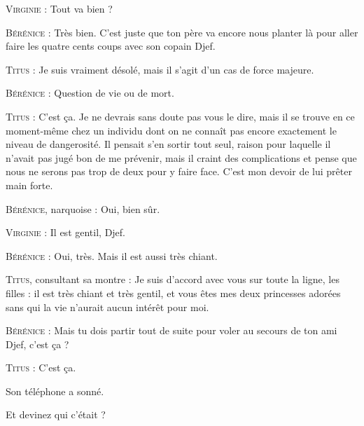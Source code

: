 \begin{dialogue}

\textsc{Virginie} : Tout va bien ?

\textsc{Bérénice} : Très bien. C’est juste que ton père va encore nous planter là pour aller faire les quatre cents coups avec son copain Djef.

\textsc{Titus} : Je suis vraiment désolé, mais il s’agit d’un cas de force majeure.

\textsc{Bérénice} : Question de vie ou de mort.

\textsc{Titus} : C’est ça. Je ne devrais sans doute pas vous le dire, mais il se trouve en ce moment-même chez un individu dont on ne connaît pas encore exactement le niveau de dangerosité. Il pensait s’en sortir tout seul, raison pour laquelle il n’avait pas jugé bon de me prévenir, mais il craint des complications et pense que nous ne serons pas trop de deux pour y faire face. C’est mon devoir de lui prêter main forte.

\textsc{Bérénice}, narquoise : Oui, bien sûr.

\textsc{Virginie} : Il est gentil, Djef.

\textsc{Bérénice} : Oui, très. Mais il est aussi très chiant.

\textsc{Titus}, consultant sa montre : Je suis d’accord avec vous sur toute la ligne, les filles : il est très chiant et très gentil, et vous êtes mes deux princesses adorées sans qui la vie n’aurait aucun intérêt pour moi.

\textsc{Bérénice} : Mais tu dois partir tout de suite pour voler au secours de ton ami Djef, c’est ça ?

\textsc{Titus} : C’est ça.

\end{dialogue}

Son téléphone a sonné.

Et devinez qui c’était ?

